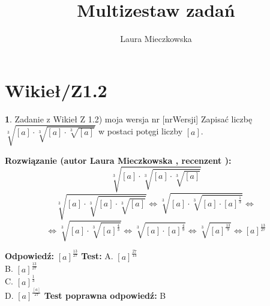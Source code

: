 \documentclass[12pt, a4paper]{article}
\title{Multizestaw zadań}
\author{Laura Mieczkowska}
\date{}
\theoremstyle{definition} %
\newtheorem{zad}{}
\newcommand{\kategoria}[1]{\section{#1}} %
\newcommand{\zadStart}[1]{\begin{zad}#1\newline} %
\newcommand{\zadStop}{\end{zad}}   %
\newcommand{\rozwStart}[2]{\noindent \textbf{Rozwiązanie (autor #1 , recenzent #2): }\newline} %
\newcommand{\odpStart}{\noindent \textbf{Odpowiedź:}\newline}    %
\newcommand{\odpStop}{\newline}                                             %
\newcommand{\testStart}{\noindent \textbf{Test:}\newline} %
\newcommand{\testStop}{\newline} %
\newcommand{\kluczStart}{\noindent \textbf{Test poprawna odpowiedź:}\newline} %
\newcommand{\kluczStop}{\newline} %
\begin{document}
\maketitle


\kategoria{Wikieł/Z1.2}
\zadStart{Zadanie z Wikieł Z 1.2) moja wersja nr [nrWersji]}
Zapisać liczbę $\sqrt[3]{[a]\cdot\sqrt[3]{[a]\cdot\sqrt[3]{[a]}}}$ w postaci potęgi liczby $[a]$.
\zadStop
\rozwStart{Laura Mieczkowska}{}
$$\sqrt[3]{[a]\cdot\sqrt[3]{[a]\cdot\sqrt[3]{[a]}}}$$ 
$$\sqrt[3]{[a]\cdot\sqrt[3]{[a]\cdot\sqrt[3]{[a]}}} \Leftrightarrow \sqrt[3]{[a]\cdot\sqrt[3]{[a]\cdot[a]^{\frac{1}{3}}}}\Leftrightarrow $$
$$\Leftrightarrow \sqrt[3]{[a]\cdot\sqrt[3]{[a]^{\frac{4}{3}}}} \Leftrightarrow \sqrt[3]{[a]\cdot[a]^{\frac{4}{9}}}\Leftrightarrow \sqrt[3]{[a]^{\frac{13}{9}}} \Leftrightarrow[a]^{\frac{13}{27}}$$


\odpStart
$[a]^{\frac{13}{27}}$
\odpStop
\testStart
A. $[a]^{\frac{27}{13}}$ \\
B. $[a]^{\frac{13}{27}}$ \\
C. $[a]^{\frac{1}{3}}$ \\
D. $[a]^{\frac{[a]}{27}}$ 
\testStop
\kluczStart
B
\kluczStop
\end{document}
